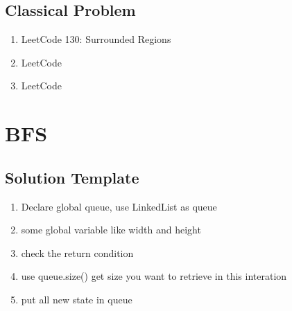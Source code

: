 \section{ Classical Problem }

\begin{enumerate}
    \item LeetCode 130: Surrounded Regions
    \item LeetCode
    \item LeetCode

\end{enumerate}

\chapter{ BFS }

\section{ Solution Template }

 \begin{enumerate}
    \item  Declare global queue, use LinkedList as queue

    \item  some global variable like width and height

    \item  check the return condition

    \item  use queue.size() get size you want to retrieve in this interation

    \item  put all new state in queue



\end{enumerate}
